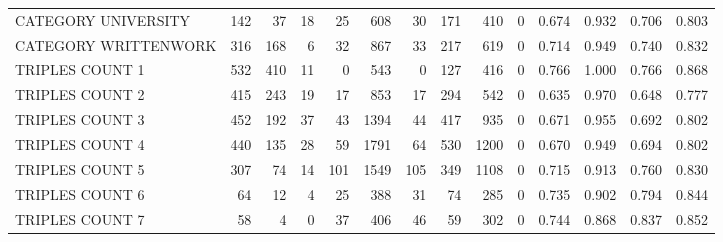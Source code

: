 \begin{tabular}{lrrrrrrrrrllll}
 CATEGORY UNIVERSITY      &             142 &            37 &              18 &              25 &             608 &   30 &  171 &  410 &    0 & 0.674 & 0.932 & 0.706 & 0.803 \\
 CATEGORY WRITTENWORK     &             316 &           168 &               6 &              32 &             867 &   33 &  217 &  619 &    0 & 0.714 & 0.949 & 0.740 & 0.832 \\
 TRIPLES COUNT 1          &             532 &           410 &              11 &               0 &             543 &    0 &  127 &  416 &    0 & 0.766 & 1.000 & 0.766 & 0.868 \\
 TRIPLES COUNT 2          &             415 &           243 &              19 &              17 &             853 &   17 &  294 &  542 &    0 & 0.635 & 0.970 & 0.648 & 0.777 \\
 TRIPLES COUNT 3          &             452 &           192 &              37 &              43 &            1394 &   44 &  417 &  935 &    0 & 0.671 & 0.955 & 0.692 & 0.802 \\
 TRIPLES COUNT 4          &             440 &           135 &              28 &              59 &            1791 &   64 &  530 & 1200 &    0 & 0.670 & 0.949 & 0.694 & 0.802 \\
 TRIPLES COUNT 5          &             307 &            74 &              14 &             101 &            1549 &  105 &  349 & 1108 &    0 & 0.715 & 0.913 & 0.760 & 0.830 \\
 TRIPLES COUNT 6          &              64 &            12 &               4 &              25 &             388 &   31 &   74 &  285 &    0 & 0.735 & 0.902 & 0.794 & 0.844 \\
 TRIPLES COUNT 7          &              58 &             4 &               0 &              37 &             406 &   46 &   59 &  302 &    0 & 0.744 & 0.868 & 0.837 & 0.852 \\
\hline
\end{tabular}